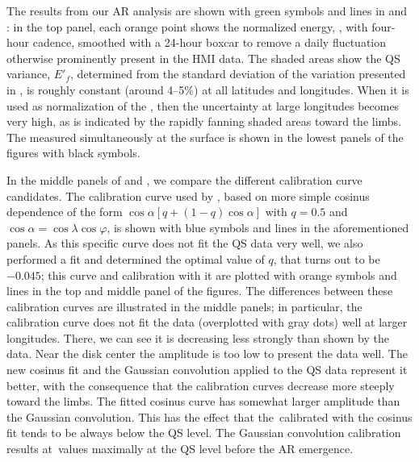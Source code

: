 \documentclass{aa}
\begin{document}
The results from our AR analysis are shown with green symbols and lines in  and : in the top panel, each orange point shows the normalized \fff energy, \eft, with four-hour cadence, 
smoothed with a 24-hour boxcar to remove a daily fluctuation
otherwise prominently present in the HMI data. The shaded areas show the QS variance, $E'_f$,
determined from the standard deviation of the variation presented in ,
is roughly constant (around 4--5\%) at all latitudes and longitudes. When it is used as normalization of the \fffns, then the uncertainty at large longitudes becomes very high, as is indicated by the rapidly 
fanning 
shaded areas toward the limbs. The \brms{} measured simultaneously at the surface is shown in the lowest panels of the figures with black symbols. 

In the middle panels of  and , we compare the different calibration curve candidates.
The calibration curve used by 
\cite{SRB16},
based on more simple cosinus dependence of the form $\cos{\alpha} \left[q + \left(1-q \right) \cos{\alpha} \right]$ with $q=0.5$
and $\cos\alpha = \cos\lambda \cos\varphi$, is shown with blue symbols and lines in the aforementioned panels.
As this specific curve does not fit the QS data very well, we also performed a fit and determined the optimal value of $q$, that turns out to be $-0.045$; this curve and calibration with it are plotted with orange symbols and lines in the top and middle panel of the figures.
The differences between these calibration curves are illustrated in the middle panels; in particular, the \cite{SRB16} calibration
curve does not fit the data (overplotted with gray dots) well at larger longitudes. There, we can see it 
is decreasing less 
strongly
than shown by the data. Near the disk center the amplitude is too low to present the data well.
The new cosinus fit and the Gaussian convolution applied to the QS
data represent it better, with the consequence that the calibration curves decrease more steeply toward the limbs.
The fitted cosinus curve has somewhat larger amplitude than the Gaussian convolution. This has the effect that the \eft\,calibrated
with the cosinus fit tends to be always below the QS level. The Gaussian convolution calibration results at \eft\,values maximally at the QS level before the AR emergence.
\end{document}
